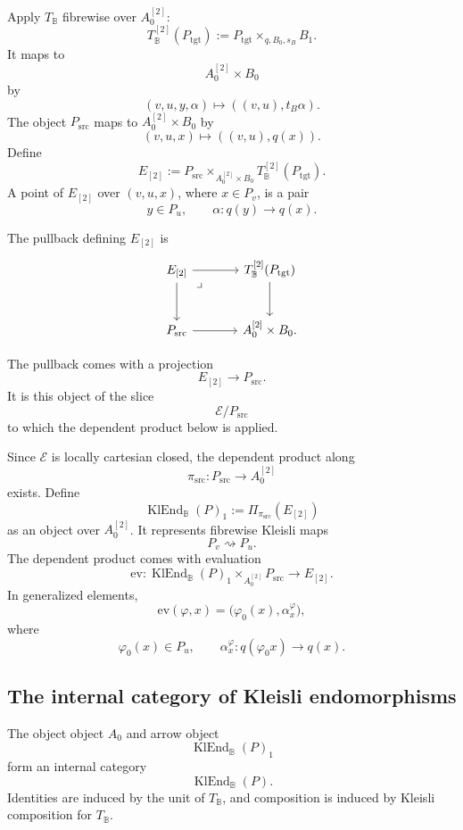 Apply \(T_{\mathbb B}\) fibrewise over \(A_0^{[2]}\):
\[
    T_{\mathbb B}^{[2]}(P_{\mathrm{tgt}})
    :=
    P_{\mathrm{tgt}}\times_{q,B_0,s_B}B_1.
\]
It maps to
\[
    A_0^{[2]}\times B_0
\]
by
\[
    (v,u,y,\alpha)
    \longmapsto
    ((v,u),t_B\alpha).
\]
The object \(P_{\mathrm{src}}\) maps to \(A_0^{[2]}\times B_0\) by
\[
    (v,u,x)
    \longmapsto
    ((v,u),q(x)).
\]
Define
\[
    E_{[2]}
    :=
    P_{\mathrm{src}}
    \times_{A_0^{[2]}\times B_0}
    T_{\mathbb B}^{[2]}(P_{\mathrm{tgt}}).
\]
A point of \(E_{[2]}\) over \((v,u,x)\), where \(x\in P_v\), is a pair
\[
    y\in P_u,
    \qquad
    \alpha:q(y)\to q(x).
\]

The pullback defining \(E_{[2]}\) is
\[
\begin{tikzcd}[column sep=large, row sep=large]
    E_{[2]}
        \arrow[r]
        \arrow[d]
        \arrow[dr, phantom, "\lrcorner", very near start]
    &
    T_{\mathbb B}^{[2]}(P_{\mathrm{tgt}})
        \arrow[d]
    \\
    P_{\mathrm{src}}
        \arrow[r]
    &
    A_0^{[2]}\times B_0 .
\end{tikzcd}
\]

The pullback comes with a projection
\[
    E_{[2]}\to P_{\mathrm{src}}.
\]
It is this object of the slice
\[
    \mathcal E/P_{\mathrm{src}}
\]
to which the dependent product below is applied.

Since \(\mathcal E\) is locally cartesian closed, the dependent product along
\[
    \pi_{\mathrm{src}}:P_{\mathrm{src}}\to A_0^{[2]}
\]
exists. Define
\[
    \operatorname{KlEnd}_{\mathbb B}(P)_1
    :=
    \Pi_{\pi_{\mathrm{src}}}(E_{[2]})
\]
as an object over \(A_0^{[2]}\). It represents fibrewise Kleisli maps
\[
    P_v\rightsquigarrow P_u.
\]
The dependent product comes with evaluation
\[
    \mathrm{ev}:
    \operatorname{KlEnd}_{\mathbb B}(P)_1
    \times_{A_0^{[2]}}
    P_{\mathrm{src}}
    \longrightarrow
    E_{[2]}.
\]
In generalized elements,
\[
    \mathrm{ev}(\varphi,x)
    =
    \bigl(\varphi_0(x),\alpha^\varphi_x\bigr),
\]
where
\[
    \varphi_0(x)\in P_u,
    \qquad
    \alpha^\varphi_x:q(\varphi_0x)\to q(x).
\]

\subsection{The internal category of Kleisli endomorphisms}
\label{subsec:to-klend-internal-category}

\begin{proposition}
\label{prop:to-klend-internal-category}
    The object object \(A_0\) and arrow object
    \[
        \operatorname{KlEnd}_{\mathbb B}(P)_1
    \]
    form an internal category
    \[
        \operatorname{KlEnd}_{\mathbb B}(P).
    \]
    Identities are induced by the unit of \(T_{\mathbb B}\), and composition is
    induced by Kleisli composition for \(T_{\mathbb B}\).
\end{proposition}

